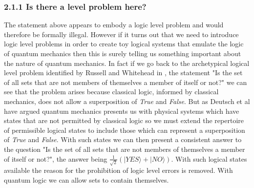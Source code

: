 \documentclass[
   ,final            %
  ]
  {aipproc}
\begin{document}
\subsubsection{2.1.1 Is there a level problem here?}
The statement above appears to embody a logic level problem and would therefore be formally illegal. However if it turns out that we need to
introduce logic level problems in order to create toy logical systems that emulate the logic of quantum mechanics then this is surely telling us %
something important about the nature of quantum mechanics. 
In fact if we go back to the archetypical logical level problem identified by Russell and Whitehead in \citet{Russel_Whithead}, the statement "Is the %
set of all sets that are not members of themselves a member of itself or not?" we can see that the problem arises because classical logic, informed by %
classical mechanics, does not allow a superposition of \emph{True} and \emph{False}. But as Deutsch et al \cite{deutsch_ekert_lupacchini_00} have %
argued quantum mechanics presents us with physical systems which have states that are not permitted by classical logic so we must extend the %
repertoire of permissible logical states to include those which can represent a superposition of \emph{True} and \emph{False}. With such states we can %
then present a consistent answer to the question "Is the set of all sets that are not members of themselves a member of itself or not?", the answer %
being $\frac{1}{\sqrt{2}}(|YES \rangle+|NO \rangle)$. With such logical states available the reason for the prohibition of logic level errors is %
removed. With quantum logic we can allow sets to contain themselves.
\end{document}
